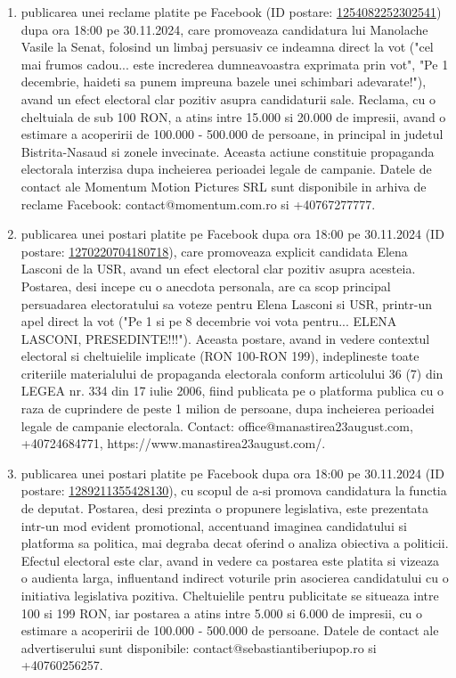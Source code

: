 \documentclass[a4paper,12pt]{article}
\begin{document}
\begin{enumerate}[leftmargin=*, label=\arabic*.)]
    \item publicarea unei reclame platite pe Facebook (ID postare: \href{https://www.facebook.com/ads/library/?id=1254082252302541}{1254082252302541}) dupa ora 18:00 pe 30.11.2024, care promoveaza candidatura lui Manolache Vasile la Senat, folosind un limbaj persuasiv ce indeamna direct la vot ("cel mai frumos cadou... este increderea dumneavoastra exprimata prin vot", "Pe 1 decembrie, haideti sa punem impreuna bazele unei schimbari adevarate!"), avand un efect electoral clar pozitiv asupra candidaturii sale. Reclama, cu o cheltuiala de sub 100 RON, a atins intre 15.000 si 20.000 de impresii, avand o estimare a acoperirii de 100.000 - 500.000 de persoane, in principal in judetul Bistrita-Nasaud si zonele invecinate.  Aceasta actiune constituie propaganda electorala interzisa dupa incheierea perioadei legale de campanie.  Datele de contact ale Momentum Motion Pictures SRL sunt disponibile in arhiva de reclame Facebook: contact@momentum.com.ro si +40767277777.
    \item publicarea unei postari platite pe Facebook dupa ora 18:00 pe 30.11.2024 (ID postare: \href{https://www.facebook.com/ads/library/?id=1270220704180718}{1270220704180718}), care promoveaza explicit candidata Elena Lasconi de la USR, avand un efect electoral clar pozitiv asupra acesteia. Postarea, desi incepe cu o anecdota personala, are ca scop principal persuadarea electoratului sa voteze pentru Elena Lasconi si USR, printr-un apel direct la vot ("Pe 1 si pe 8 decembrie voi vota pentru... ELENA LASCONI, PRESEDINTE!!!").  Aceasta postare, avand in vedere contextul electoral si cheltuielile implicate (RON 100-RON 199), indeplineste toate criteriile materialului de propaganda electorala conform articolului 36 (7) din LEGEA nr. 334 din 17 iulie 2006, fiind publicata pe o platforma publica cu o raza de cuprindere de peste 1 milion de persoane, dupa incheierea perioadei legale de campanie electorala.  Contact: office@manastirea23august.com, +40724684771, https://www.manastirea23august.com/.
    \item publicarea unei postari platite pe Facebook dupa ora 18:00 pe 30.11.2024 (ID postare: \href{https://www.facebook.com/ads/library/?id=1289211355428130}{1289211355428130}), cu scopul de a-si promova candidatura la functia de deputat. Postarea, desi prezinta o propunere legislativa, este prezentata intr-un mod evident promotional, accentuand imaginea candidatului si platforma sa politica, mai degraba decat oferind o analiza obiectiva a politicii.  Efectul electoral este clar, avand in vedere ca postarea este platita si vizeaza o audienta larga, influentand indirect voturile prin asocierea candidatului cu o initiativa legislativa pozitiva.  Cheltuielile pentru publicitate se situeaza intre 100 si 199 RON, iar postarea a atins intre 5.000 si 6.000 de impresii, cu o estimare a acoperirii de 100.000 - 500.000 de persoane.  Datele de contact ale advertiserului sunt disponibile: contact@sebastiantiberiupop.ro si +40760256257.

\end{enumerate}
\end{document}
